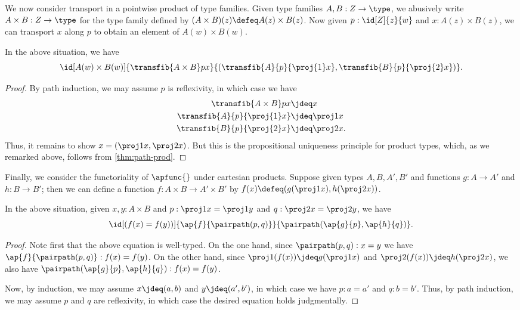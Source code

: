 %
We now consider transport in a pointwise product of type families.
Given type families $ A, B : Z \to \type$, we abusively write $A\times B:Z\to \type$ for the type family defined by $(A\times B)(z) \defeq A(z) \times B(z)$.
Now given $p : \id[Z]{z}{w}$ and $x : A(z) \times B(z)$, we can transport $x$ along $p$ to obtain an element of $A(w)\times B(w)$.

\begin{thm}\label{thm:trans-prod}
  In the above situation, we have
  \[
  \id[A(w) \times B(w)]
  {\transfib{A\times B}px}
  {(\transfib{A}{p}{\proj{1}x}, \transfib{B}{p}{\proj{2}x})}.
  \]
\end{thm}
\begin{proof}
  By path induction, we may assume $p$ is reflexivity, in which case we have
  \begin{align*}
    \transfib{A\times B}px&\jdeq x\\
    \transfib{A}{p}{\proj{1}x}&\jdeq \proj1x\\
    \transfib{B}{p}{\proj{2}x}&\jdeq \proj2x.
  \end{align*}
  Thus, it remains to show $x = (\proj1 x, \proj2x)$.
  But this is the propositional uniqueness principle for product types, which, as we remarked above, follows from \cref{thm:path-prod}.
\end{proof}

Finally, we consider the functoriality of $\apfunc{}$ under cartesian products.
Suppose given types $A,B,A',B'$ and functions $g:A\to A'$ and $h:B\to B'$; then we can define a function $f:A\times B\to A'\times B'$ by $f(x) \defeq (g(\proj1x),h(\proj2x))$.

\begin{thm}\label{thm:ap-prod}
  In the above situation, given $x,y:A\times B$ and $p:\proj1x=\proj1y$ and $q:\proj2x=\proj2y$, we have
  \[ \id[(f(x)=f(y))]{\ap{f}{\pairpath(p,q)}} {\pairpath(\ap{g}{p},\ap{h}{q})}. \]
\end{thm}
\begin{proof}
  Note first that the above equation is well-typed.
  On the one hand, since $\pairpath(p,q):x=y$ we have $\ap{f}{\pairpath(p,q)}:f(x)=f(y)$.
  On the other hand, since $\proj1(f(x))\jdeq g(\proj1x)$ and $\proj2(f(x))\jdeq h(\proj2x)$, we also have $\pairpath(\ap{g}{p},\ap{h}{q}):f(x)=f(y)$.

  Now, by induction, we may assume $x\jdeq(a,b)$ and $y\jdeq(a',b')$, in which case we have $p:a=a'$ and $q:b=b'$.
  Thus, by path induction, we may assume $p$ and $q$ are reflexivity, in which case the desired equation holds judgmentally.
\end{proof}

